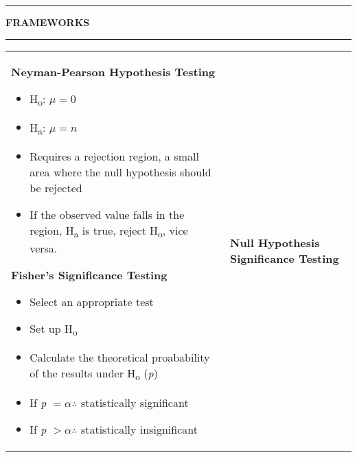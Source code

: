 \documentclass[6pt]{article}
\newcommand{\HL}{\par\noindent\rule{\textwidth}{0.4pt}}
\begin{document}
\begin{footnotesize}
\HL

\begin{flushleft}
\textbf{FRAMEWORKS}
\end{flushleft}

\HL


\begin{tabular}{l | l} 

\parbox{0.5\textwidth}{

\begin{flushleft}
\textbf{Neyman-Pearson Hypothesis Testing}
\end{flushleft}

\begin{itemize}
\item H\textsubscript{o}: $\mu = 0$
\item H\textsubscript{a}: $\mu = n$
\item Requires a rejection region, a small area where the null hypothesis should be rejected
\item If the observed value falls in the region, H\textsubscript{a} is true, reject H\textsubscript{o}, vice versa.
\end{itemize}

\begin{flushleft}
\textbf{Fisher's Significance Testing}
\end{flushleft}

\begin{itemize}
\item Select an appropriate test
\item Set up H\textsubscript{o}
\item Calculate the theoretical proabability of the results under H\textsubscript{o} (\emph{p})
\item If \emph{p} $= \alpha \therefore$ statistically significant
\item If \emph{p} $> \alpha \therefore$ statistically insignificant
\end{itemize}

}

&

\parbox{0.5\textwidth}{

\begin{flushright}

\begin{flushleft}
\textbf{Null Hypothesis Significance Testing}
\end{flushleft}

\begin{itemize}


\end{itemize}
\end{flushright}}
\end{tabular}
\end{footnotesize}
\end{document}
